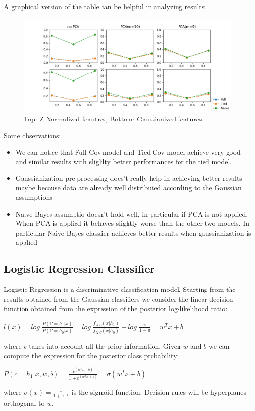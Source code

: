 \documentclass[10pt, a4paper, twocolumn]{article} %
\begin{document}
A graphical version of the table can be helpful in analyzing results:
\begin{figure}[ht!]
	\includegraphics[width=\linewidth]{./Pictures/FeaturesAnalysis/gaumodels.png}
	\caption{Top: Z-Normalized feautres, Bottom: Gaussianized features}
	\label{gauplots} 
\end{figure}

Some observations:
\begin{itemize}
	\item We can notice that Full-Cov model and Tied-Cov model achieve very good and similar results with
		  slighlty better performances for the tied model.
	\item Gaussianization pre processing does't really help in achieving better results maybe
		  because data are already well distributed according to the Gaussian assumptions
	\item Naive Bayes assumptio doesn't hold well, in particular if PCA is not applied. When 
		  PCA is applied it behaves slightly worse than the other two models. In particular Naive
		  Bayes classfier achieves better results when gaussianization is applied
\end{itemize}

\subsection{Logistic Regression Classifier}
Logistic Regression is a discriminative classification model. Starting from the results obtained
from the Gaussian classifiers we consider the linear decision function obtained from the expression
of the posterior log-likelihood ratio:
\begin{center}
	\begin{math}
		l(x) = log\;\frac{P(C=h_1|x)}{P(C=h_0|x)}=log\;\frac{f_{X|C}(x|h_1)}{f_{X|C}(x|h_0)} + log\;\frac{\pi}{1-\pi} = w^Tx + b
	\end{math}
\end{center}
where $b$ takes into account all the prior information. Given $w$ and $b$ we can compute the
expression for the posterior class probability:
\begin{center}
	\begin{math}
		P(c=h_1|x,w,b)=\frac{e^{(w^Tx + b)}}{1+e^{(w^Tx+b)}}=\sigma(w^Tx+b)
	\end{math}
\end{center}
where $\sigma(x)=\frac{1}{1+e^{-x}}$ is the sigmoid function. Decision rules will be hyperplanes
orthogonal to $w$.
\end{document}
